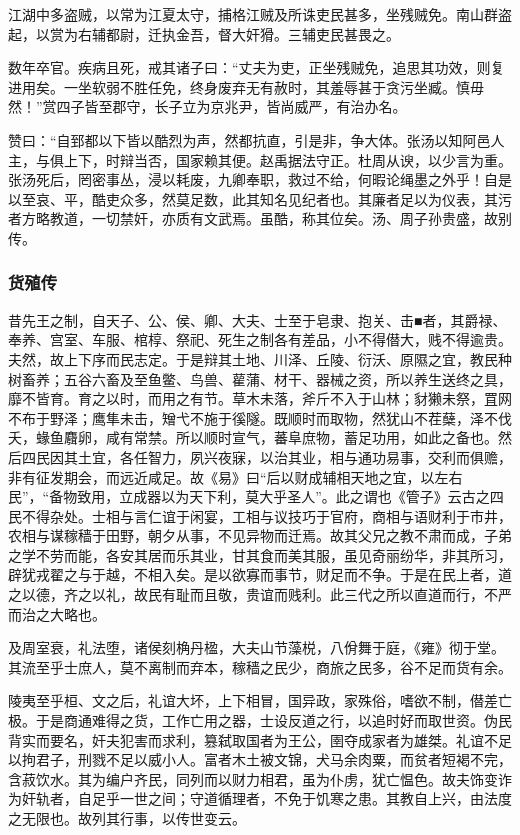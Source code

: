 \documentclass[]{article}
\begin{document}
江湖中多盗贼，以常为江夏太守，捕格江贼及所诛吏民甚多，坐残贼免。南山群盗起，以赏为右辅都尉，迁执金吾，督大奸猾。三辅吏民甚畏之。

数年卒官。疾病且死，戒其诸子曰：``丈夫为吏，正坐残贼免，追思其功效，则复进用矣。一坐软弱不胜任免，终身废弃无有赦时，其羞辱甚于贪污坐臧。慎毋然！''赏四子皆至郡守，长子立为京兆尹，皆尚威严，有治办名。

赞曰：``自郅都以下皆以酷烈为声，然都抗直，引是非，争大体。张汤以知阿邑人主，与俱上下，时辩当否，国家赖其便。赵禹据法守正。杜周从谀，以少言为重。张汤死后，罔密事丛，浸以耗废，九卿奉职，救过不给，何暇论绳墨之外乎！自是以至哀、平，酷吏众多，然莫足数，此其知名见纪者也。其廉者足以为仪表，其污者方略教道，一切禁奸，亦质有文武焉。虽酷，称其位矣。汤、周子孙贵盛，故别传。

\hypertarget{header-n6060}{%
\subsubsection{货殖传}\label{header-n6060}}

昔先王之制，自天子、公、侯、卿、大夫、士至于皂隶、抱关、击■者，其爵禄、奉养、宫室、车服、棺椁、祭祀、死生之制各有差品，小不得僣大，贱不得逾贵。夫然，故上下序而民志定。于是辩其土地、川泽、丘陵、衍沃、原隰之宜，教民种树畜养；五谷六畜及至鱼鳖、鸟兽、雚蒲、材干、器械之资，所以养生送终之具，靡不皆育。育之以时，而用之有节。草木未落，斧斤不入于山林；豺獭未祭，罝网不布于野泽；鹰隼未击，矰弋不施于徯隧。既顺时而取物，然犹山不茬蘖，泽不伐夭，蝝鱼麛卵，咸有常禁。所以顺时宣气，蕃阜庶物，蓄足功用，如此之备也。然后四民因其土宜，各任智力，夙兴夜寐，以治其业，相与通功易事，交利而俱赡，非有征发期会，而远近咸足。故《易》曰``后以财成辅相天地之宜，以左右民''，``备物致用，立成器以为天下利，莫大乎圣人''。此之谓也《管子》云古之四民不得杂处。士相与言仁谊于闲宴，工相与议技巧于官府，商相与语财利于市井，农相与谋稼穑于田野，朝夕从事，不见异物而迁焉。故其父兄之教不肃而成，子弟之学不劳而能，各安其居而乐其业，甘其食而美其服，虽见奇丽纷华，非其所习，辟犹戎翟之与于越，不相入矣。是以欲寡而事节，财足而不争。于是在民上者，道之以德，齐之以礼，故民有耻而且敬，贵谊而贱利。此三代之所以直道而行，不严而治之大略也。

及周室衰，礼法堕，诸侯刻桷丹楹，大夫山节藻棁，八佾舞于庭，《雍》彻于堂。其流至乎士庶人，莫不离制而弃本，稼穑之民少，商旅之民多，谷不足而货有余。

陵夷至乎桓、文之后，礼谊大坏，上下相冒，国异政，家殊俗，嗜欲不制，僣差亡极。于是商通难得之货，工作亡用之器，士设反道之行，以追时好而取世资。伪民背实而要名，奸夫犯害而求利，篡弑取国者为王公，圉夺成家者为雄桀。礼谊不足以拘君子，刑戮不足以威小人。富者木土被文锦，犬马余肉粟，而贫者短褐不完，含菽饮水。其为编户齐民，同列而以财力相君，虽为仆虏，犹亡愠色。故夫饰变诈为奸轨者，自足乎一世之间；守道循理者，不免于饥寒之患。其教自上兴，由法度之无限也。故列其行事，以传世变云。
\end{document}
